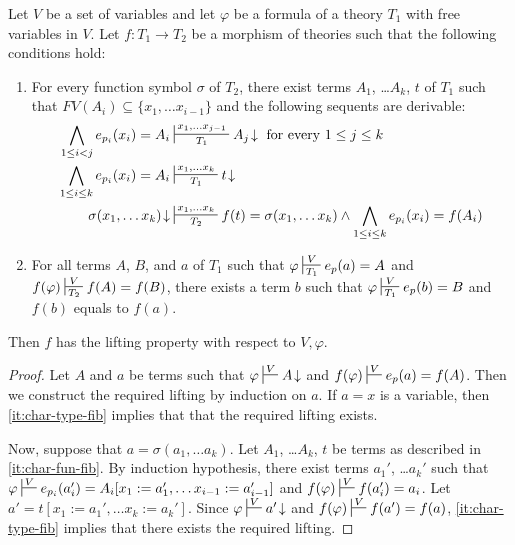 \documentclass[reqno]{amsart}
\theoremstyle{definition}
\theoremstyle{remark}
\newcommand{\repl}{:=}
\numberwithin{figure}{section}
\begin{document}
\begin{lem}
Let $V$ be a set of variables and let $\varphi$ be a formula of a theory $T_1$ with free variables in $V$.
Let $f : T_1 \to T_2$ be a morphism of theories such that the following conditions hold:
\begin{enumerate}
\item \label{it:char-fun-fib} For every function symbol $\sigma$ of $T_2$, there exist terms $A_1$, \ldots $A_k$, $t$ of $T_1$ such that $FV(A_i) \subseteq \{ x_1, \ldots x_{i-1} \}$ and the following sequents are derivable:
\begin{align*}
\bigwedge_{1 \leq i < j} e_{p_i}(x_i) = A_i & \sststile{T_1}{x_1, \ldots x_{j-1}} A_j\!\downarrow \text{ for every } 1 \leq j \leq k \\
\bigwedge_{1 \leq i \leq k} e_{p_i}(x_i) = A_i & \sststile{T_1}{x_1, \ldots x_k} t\!\downarrow \\
\sigma(x_1, \ldots x_k)\!\downarrow & \sststile{T_2}{x_1, \ldots x_k} f(t) = \sigma(x_1, \ldots x_k) \land \bigwedge_{1 \leq i \leq k} e_{p_i}(x_i) = f(A_i)
\end{align*}
\item \label{it:char-type-fib} For all terms $A$, $B$, and $a$ of $T_1$ such that $\varphi \sststile{T_1}{V} e_p(a) = A$ and $f(\varphi) \sststile{T_2}{V} f(A) = f(B)$,
there exists a term $b$ such that $\varphi \sststile{T_1}{V} e_p(b) = B$ and $f(b)$ equals to $f(a)$.
\end{enumerate}
Then $f$ has the lifting property with respect to $V,\varphi$.
\end{lem}
\begin{proof}
Let $A$ and $a$ be terms such that $\varphi \sststile{}{V} A\!\downarrow$ and $f(\varphi) \sststile{}{V} e_p(a) = f(A)$.
Then we construct the required lifting by induction on $a$.
If $a = x$ is a variable, then \eqref{it:char-type-fib} implies that that the required lifting exists.

Now, suppose that $a = \sigma(a_1, \ldots a_k)$.
Let $A_1$, \ldots $A_k$, $t$ be terms as described in \eqref{it:char-fun-fib}.
By induction hypothesis, there exist terms $a_1'$, \ldots $a_k'$ such that $\varphi \sststile{}{V} e_{p_i}(a_i') = A_i[x_1 \repl a_1', \ldots x_{i-1} \repl a_{i-1}']$ and $f(\varphi) \sststile{}{V} f(a_i') = a_i$.
Let $a' = t[x_1 \repl a_1', \ldots x_k \repl a_k']$.
Since $\varphi \sststile{}{V} a'\!\downarrow$ and $f(\varphi) \sststile{}{V} f(a') = f(a)$, \eqref{it:char-type-fib} implies that there exists the required lifting.
\end{proof}
\end{document}
